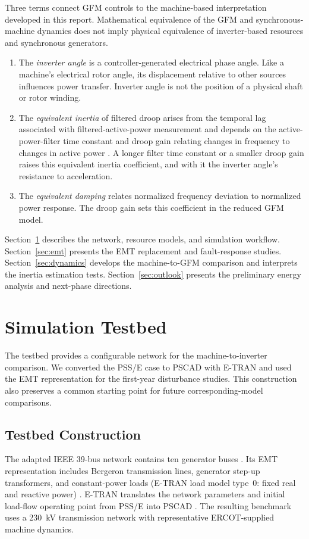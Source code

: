 \documentclass[11pt]{article}
\begin{document}
Three terms connect GFM controls to the machine-based interpretation developed in this report. Mathematical equivalence of the GFM and synchronous-machine dynamics does not imply physical equivalence of inverter-based resources and synchronous generators.
\begin{enumerate}
\item The \emph{inverter angle} is a controller-generated electrical phase angle. Like a machine's electrical rotor angle, its displacement relative to other sources influences power transfer. Inverter angle is not the position of a physical shaft or rotor winding.
\item The \emph{equivalent inertia} of filtered droop arises from the temporal lag associated with filtered-active-power measurement and depends on the active-power-filter time constant and droop gain relating changes in frequency to changes in active power \cite{chatterjee2026note,chatterjee2025eac}. A longer filter time constant or a smaller droop gain raises this equivalent inertia coefficient, and with it the inverter angle's resistance to acceleration. 
\item The \emph{equivalent damping} relates normalized frequency deviation to normalized power response. The droop gain sets this coefficient in the reduced GFM model.
\end{enumerate}
Section~\ref{sec:testbed} describes the network, resource models, and simulation workflow. Section~\ref{sec:emt} presents the EMT replacement and fault-response studies. Section~\ref{sec:dynamics} develops the machine-to-GFM comparison and interprets the inertia estimation tests. Section~\ref{sec:outlook} presents the preliminary energy analysis and next-phase directions.

\section{Simulation Testbed}
\label{sec:testbed}
The testbed provides a configurable network for the machine-to-inverter comparison. We converted the PSS/E case to PSCAD with E-TRAN and used the EMT representation for the first-year disturbance studies. This construction also preserves a common starting point for future corresponding-model comparisons.

\subsection{Testbed Construction}
The adapted IEEE 39-bus network contains ten generator buses \cite{pscad39bus,pscad39note}. Its EMT representation includes Bergeron transmission lines, generator step-up transformers, and constant-power loads (E-TRAN load model type~0: fixed real and reactive power) \cite{pscadbergeron}. E-TRAN translates the network parameters and initial load-flow operating point from PSS/E into PSCAD \cite{etran}. The resulting benchmark uses a 230~kV transmission network with representative ERCOT-supplied machine dynamics.
\end{document}
